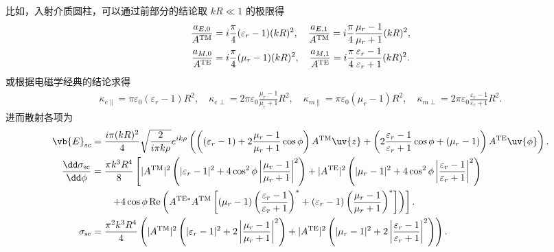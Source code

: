 \begin{exbox}
	比如，入射介质圆柱，可以通过前部分的结论取 \(kR \ll 1\) 的极限得
	\begin{align*}
		\frac{a_{E,0}}{A^{\rm TM}} &= i\frac{\pi}{4}(\varepsilon_r-1)(kR)^2,\quad\frac{a_{E,1}}{A^{\rm TM}} = i\frac{\pi}{4}\frac{\mu_r-1}{\mu_r+1}(kR)^2,\\
		\frac{a_{M,0}}{A^{\rm TE}} &= i\frac{\pi}{4}(\mu_r-1)(kR)^2,\quad\frac{a_{M,1}}{A^{\rm TE}} = i\frac{\pi}{4}\frac{\varepsilon_r-1}{\varepsilon_r+1}(kR)^2.
	\end{align*}
	或根据电磁学经典的结论求得
	\begin{align*}
		\kappa_{e\parallel} = \pi\varepsilon_0(\varepsilon_r-1)R^2,\quad\kappa_{e\perp} = 2\pi\varepsilon_0\frac{\mu_r-1}{\mu_r+1}R^2,\quad
		\kappa_{m\parallel} = \pi\varepsilon_0(\mu_r-1)R^2,\quad\kappa_{m\perp} = 2\pi\varepsilon_0\frac{\varepsilon_r-1}{\varepsilon_r+1}R^2.
	\end{align*}
	进而散射各项为
	\begin{align*}
		\vb{E}_{\mathrm{sc}} &= \frac{i\pi (kR)^{2}}{4} \sqrt{\frac{2}{i\pi k\rho}} e^{ik\rho} \left( \left( (\varepsilon_{r} - 1) + 2 \frac{\mu_{r} - 1}{\mu_{r} + 1} \cos\phi \right) A^{\mathrm{TM}} \uv{z} + \left( 2 \frac{\varepsilon_{r} - 1}{\varepsilon_{r} + 1} \cos\phi + (\mu_{r} - 1) \right) A^{\mathrm{TE}} \uv{\phi} \right).\\
		\frac{\dd \sigma_{\mathrm{sc}}}{\dd \phi} &= \frac{\pi k^{3} R^{4}}{8} \left[ |A^{\mathrm{TM}}|^{2} \left( |\varepsilon_{r} - 1|^{2} + 4 \cos^{2}\phi \left| \frac{\mu_{r} - 1}{\mu_{r} + 1} \right|^{2} \right) + |A^{\mathrm{TE}}|^{2} \left( |\mu_{r} - 1|^{2} + 4 \cos^{2}\phi \left| \frac{\varepsilon_{r} - 1}{\varepsilon_{r} + 1} \right|^{2} \right) \right. \\
		&\qquad \left. + 4 \cos\phi \, \mathrm{Re} \left( A^{\mathrm{TE}*} A^{\mathrm{TM}} \left[ (\mu_{r} - 1) \left( \frac{\varepsilon_{r} - 1}{\varepsilon_{r} + 1} \right)^{*} + (\varepsilon_{r} - 1) \left( \frac{\mu_{r} - 1}{\mu_{r} + 1} \right)^{*} \right] \right) \right].\\
		\sigma_{\mathrm{sc}} &= \frac{\pi^{2} k^{3} R^{4}}{4} \left( |A^{\mathrm{TM}}|^{2} \left( |\varepsilon_{r} - 1|^{2} + 2 \left| \frac{\mu_{r} - 1}{\mu_{r} + 1} \right|^{2} \right) + |A^{\mathrm{TE}}|^{2} \left( |\mu_{r} - 1|^{2} + 2 \left| \frac{\varepsilon_{r} - 1}{\varepsilon_{r} + 1} \right|^{2} \right) \right).
	\end{align*}



\end{exbox}
